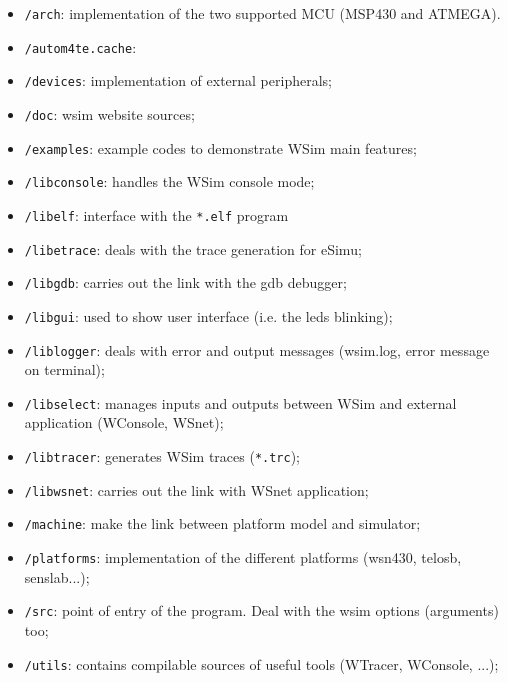 \documentclass[a4paper,10pt]{report}
\begin{document}
\begin{itemize}
  \item \verb$/arch$: implementation of the two supported MCU (MSP430 and ATMEGA).

  \item \verb$/autom4te.cache$:

  \item \verb$/devices$: implementation of external peripherals;

  \item \verb$/doc$: wsim website sources;

  \item \verb$/examples$: example codes to demonstrate WSim main features;

  \item \verb$/libconsole$: handles the WSim console mode;

  \item \verb$/libelf$: interface with the \verb$*.elf$ program

  \item \verb$/libetrace$: deals with the trace generation for eSimu;

  \item \verb$/libgdb$: carries out the link with the gdb debugger;

  \item \verb$/libgui$: used to show user interface (i.e. the leds blinking);

  \item \verb$/liblogger$: deals with error and output messages (wsim.log, error message on terminal);

  \item \verb$/libselect$: manages inputs and outputs between WSim and external application (WConsole, WSnet);

  \item \verb$/libtracer$: generates WSim traces (\verb$*.trc$);

  \item \verb$/libwsnet$: carries out the link with WSnet application;

  \item \verb$/machine$: make the link between platform model and simulator;

  \item \verb$/platforms$: implementation of the different platforms (wsn430, telosb, senslab...);

  \item \verb$/src$: point of entry of the program. Deal with the wsim options (arguments) too;

  \item \verb$/utils$: contains compilable sources of useful tools (WTracer, WConsole, ...);
\end{itemize}
\end{document}
